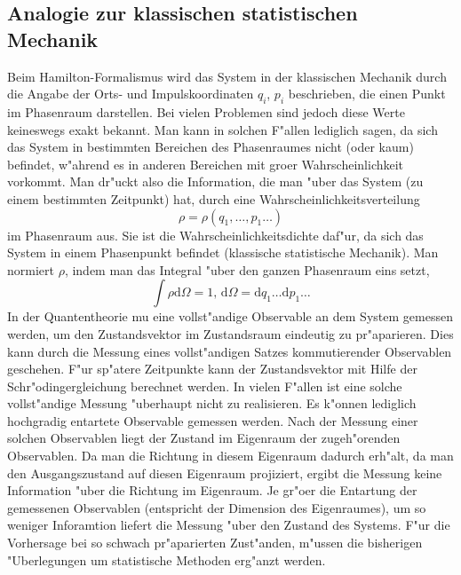   \subsection{Analogie zur klassischen statistischen Mechanik}
    Beim Hamilton-Formalismus wird das System in der klassischen Mechanik durch die Angabe der 
    Orts- und Impulskoordinaten $q_i$, $p_i$ beschrieben, die einen Punkt im Phasenraum darstellen.
    Bei vielen Problemen sind jedoch diese Werte keineswegs exakt bekannt. Man kann in solchen
    F"allen lediglich sagen, da\3 sich das System in bestimmten Bereichen des Phasenraumes
    nicht (oder kaum) befindet, w"ahrend es in anderen Bereichen mit gro\3er Wahrscheinlichkeit
    vorkommt. Man dr"uckt also die Information, die man "uber das System (zu einem
    bestimmten Zeitpunkt) hat, durch eine Wahrscheinlichkeitsverteilung
    $$ \rho = \rho\left( q_1 ,\ldots ,p_1 \ldots \right) $$
    im Phasenraum aus. Sie ist die Wahrscheinlichkeitsdichte daf"ur, da\3 sich das
    System in einem Phasenpunkt befindet (klassische statistische Mechanik). Man
    normiert $\rho$, indem man das Integral "uber den ganzen Phasenraum eins setzt,
    $$ \int\rho\mbox{d}\Omega = 1 \mbox{, d}\Omega = \mbox{d}q_1\ldots \mbox{d}p_1\ldots $$
    In der Quantentheorie mu\3  eine vollst"andige Observable an dem System gemessen werden, um den Zustandsvektor im Zustandsraum \raum{} eindeutig zu pr"aparieren. Dies kann 
    durch die Messung eines vollst"andigen Satzes kommutierender Observablen geschehen. F"ur sp"atere Zeitpunkte kann der Zustandsvektor 
    mit Hilfe der Schr"odingergleichung berechnet werden. In vielen F"allen ist eine solche vollst"andige Messung "uberhaupt nicht zu realisieren. Es
    k"onnen lediglich hochgradig entartete Observable gemessen werden. Nach der Messung einer solchen Observablen liegt der Zustand im Eigenraum der zugeh"orenden
    Observablen. Da man die Richtung in diesem Eigenraum dadurch erh"alt, da\3 man den Ausgangszustand auf diesen Eigenraum projiziert, ergibt die Messung keine
    Information "uber die Richtung im Eigenraum. Je gr"o\3er die Entartung der gemessenen Observablen (entspricht der Dimension des Eigenraumes), um so weniger
    Inforamtion liefert die Messung "uber den Zustand des Systems. F"ur die Vorhersage bei so schwach pr"aparierten Zust"anden, m"ussen die bisherigen
    "Uberlegungen um statistische Methoden erg"anzt werden.
